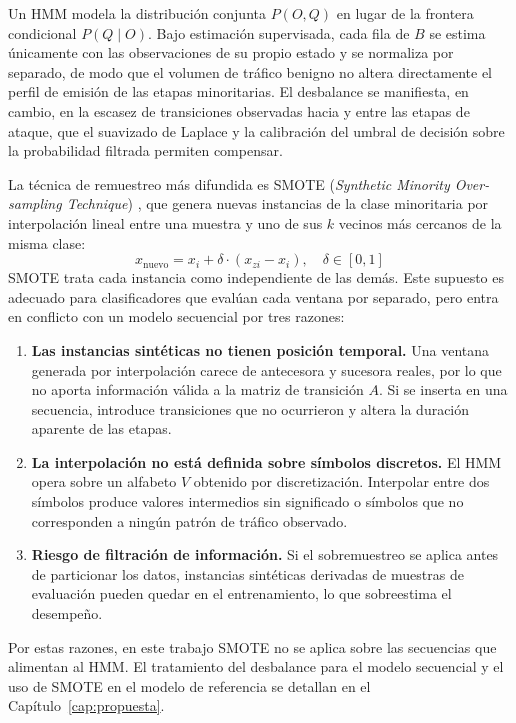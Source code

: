Un HMM modela la distribución conjunta $P(O, Q)$ en lugar de la frontera condicional $P(Q \mid O)$. Bajo estimación supervisada, cada fila de $B$ se estima únicamente con las observaciones de su propio estado y se normaliza por separado, de modo que el volumen de tráfico benigno no altera directamente el perfil de emisión de las etapas minoritarias. El desbalance se manifiesta, en cambio, en la escasez de transiciones observadas hacia y entre las etapas de ataque, que el suavizado de Laplace y la calibración del umbral de decisión sobre la probabilidad filtrada permiten compensar.

La técnica de remuestreo más difundida es SMOTE (\textit{Synthetic Minority Over-sampling Technique}) \parencite{chawla2002smote}, que genera nuevas instancias de la clase minoritaria por interpolación lineal entre una muestra y uno de sus $k$ vecinos más cercanos de la misma clase:
\begin{equation}
x_{\text{nuevo}} = x_i + \delta \cdot (x_{zi} - x_i), \quad \delta \in [0, 1]
\end{equation}
SMOTE trata cada instancia como independiente de las demás. Este supuesto es adecuado para clasificadores que evalúan cada ventana por separado, pero entra en conflicto con un modelo secuencial por tres razones:
\begin{enumerate}
    \item \textbf{Las instancias sintéticas no tienen posición temporal.} Una ventana generada por interpolación carece de antecesora y sucesora reales, por lo que no aporta información válida a la matriz de transición $A$. Si se inserta en una secuencia, introduce transiciones que no ocurrieron y altera la duración aparente de las etapas.
    \item \textbf{La interpolación no está definida sobre símbolos discretos.} El HMM opera sobre un alfabeto $V$ obtenido por discretización. Interpolar entre dos símbolos produce valores intermedios sin significado o símbolos que no corresponden a ningún patrón de tráfico observado.
    \item \textbf{Riesgo de filtración de información.} Si el sobremuestreo se aplica antes de particionar los datos, instancias sintéticas derivadas de muestras de evaluación pueden quedar en el entrenamiento, lo que sobreestima el desempeño.
\end{enumerate}
Por estas razones, en este trabajo SMOTE no se aplica sobre las secuencias que alimentan al HMM. El tratamiento del desbalance para el modelo secuencial y el uso de SMOTE en el modelo de referencia se detallan en el Capítulo~\ref{cap:propuesta}.

